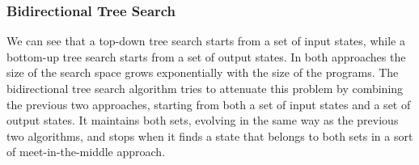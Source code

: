 \subsubsection{Bidirectional Tree Search}
\label{sec:bidirectional-search}

We can see that a top-down tree search starts from a set of input states, while
a bottom-up tree search starts from a set of output states.
In both approaches the size of the search space grows exponentially with the
size of the programs.
The bidirectional tree search algorithm tries to attenuate this problem by
combining the previous two approaches, starting from both a set of input states
and a set of output states.
It maintains both sets, evolving in the same way as the previous two
algorithms, and stops when it finds a state that belongs to both sets in a
sort of meet-in-the-middle approach.
